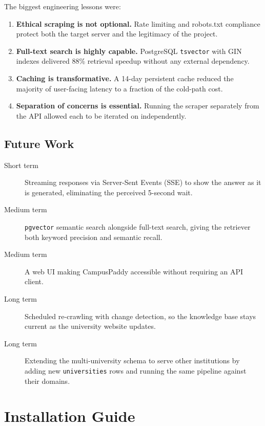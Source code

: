 \documentclass[12pt,a4paper]{report}
\begin{document}
The biggest engineering lessons were:
\begin{enumerate}
    \item \textbf{Ethical scraping is not optional.} Rate limiting and robots.txt compliance protect both the target server and the legitimacy of the project.
    \item \textbf{Full-text search is highly capable.} PostgreSQL \texttt{tsvector} with GIN indexes delivered 88\% retrieval speedup without any external dependency.
    \item \textbf{Caching is transformative.} A 14-day persistent cache reduced the majority of user-facing latency to a fraction of the cold-path cost.
    \item \textbf{Separation of concerns is essential.} Running the scraper separately from the API allowed each to be iterated on independently.
\end{enumerate}

\section{Future Work}

\begin{description}
    \item[Short term] Streaming responses via Server-Sent Events (SSE) to show the answer as it is generated, eliminating the perceived 5-second wait.
    \item[Medium term] \texttt{pgvector} semantic search alongside full-text search, giving the retriever both keyword precision and semantic recall.
    \item[Medium term] A web UI making CampusPaddy accessible without requiring an API client.
    \item[Long term] Scheduled re-crawling with change detection, so the knowledge base stays current as the university website updates.
    \item[Long term] Extending the multi-university schema to serve other institutions by adding new \texttt{universities} rows and running the same pipeline against their domains.
\end{description}

\appendix

\chapter{Installation Guide}
\end{document}
